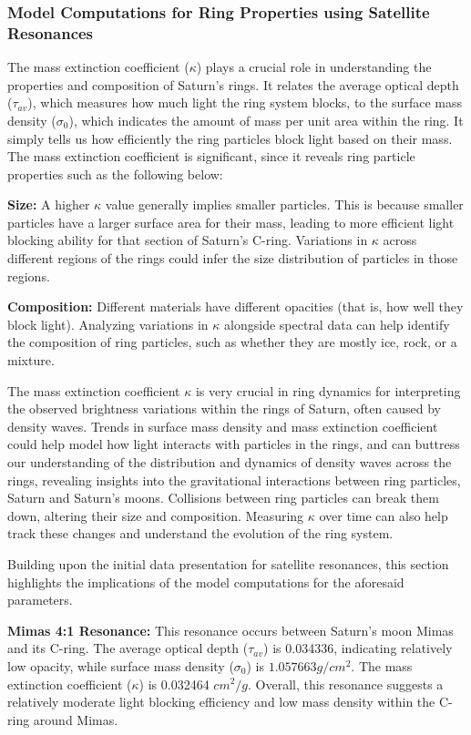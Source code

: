 \documentclass{article}
\begin{document}
\subsubsection{Model Computations for Ring Properties using Satellite Resonances}

The mass extinction coefficient ($\kappa$) plays a crucial role in understanding the properties and composition of Saturn's rings. It relates the average optical depth ($\tau_{av}$), which measures how much light the ring system blocks, to the surface mass density ($\sigma_{0}$), which indicates the amount of mass per unit area within the ring. It simply tells us how efficiently the ring particles block light based on their mass. The mass extinction coefficient is significant, since it reveals ring particle properties such as the following below:

\textbf{Size:} A higher $\kappa$ value generally implies smaller particles. This is because smaller particles have a larger surface area for their mass, leading to more efficient light blocking ability for that section of Saturn's C-ring. Variations in $\kappa$ across different regions of the rings could infer the size distribution of particles in those regions.

\textbf{Composition:} Different materials have different opacities (that is, how well they block light). Analyzing variations in $\kappa$ alongside spectral data can help identify the composition of ring particles, such as whether they are mostly ice, rock, or a mixture.

The mass extinction coefficient $\kappa$ is very crucial in ring dynamics for interpreting the observed brightness variations within the rings of Saturn, often caused by density waves. Trends in surface mass density and mass extinction coefficient could help model how light interacts with particles in the rings, and can buttress our understanding of the distribution and dynamics of density waves across the rings, revealing insights into the gravitational interactions between ring particles, Saturn and Saturn's moons. Collisions between ring particles can break them down, altering their size and composition. Measuring $\kappa$ over time can also help track these changes and understand the evolution of the ring system.

Building upon the initial data presentation for satellite resonances, this section highlights the implications of the model computations for the aforesaid parameters.

\textbf{Mimas 4:1 Resonance:}
This resonance occurs between Saturn's moon Mimas and its C-ring. The average optical depth ($\tau_{av}$) is 0.034336, indicating relatively low opacity, while surface mass density ($\sigma_{0}$) is $1.057663 g/cm^{2}$. The mass extinction coefficient ($\kappa$) is 0.032464 $cm^{2}/g$. Overall, this resonance suggests a relatively moderate light blocking efficiency and low mass density within the C-ring around Mimas.
\end{document}
